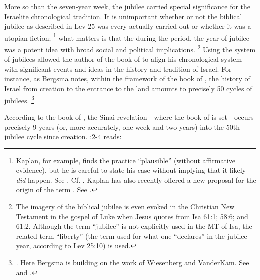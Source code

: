 More so than the seven-year week, the jubilee carried special significance for the Israelite chronological tradition. It is unimportant whether or not the biblical jubilee as described in Lev 25 was every actually carried out or whether it was a utopian fiction;%
    \footnote{Kaplan, for example, finds the practice ``plausible'' (without affirmative evidence), but he is careful to state his case without implying that it likely \emph{did} happen. See \cite{kaplan_cbq2019}. Cf. \cite[119]{wellhausen1957}. Kaplan has also recently offered a new proposal for the origin of the term . See \cite{kaplan_biblica2018}.}
what matters is that the during the \secondtemple period, the year of jubilee was a potent idea with broad social and political implications.%
    \footnote{The imagery of the biblical jubilee is even evoked in the Christian New Testament in the gospel of Luke when Jesus quotes from Isa 61:1; 58:6; and 61:2. Although the term  ``jubilee'' is not explicitly used in the MT of Isa, the related term  ``liberty'' (the term used for what one ``declares'' in the jubilee year, according to Lev 25:10) is used.}
Using the system of jubilees allowed the author of the book of \jub to align his chronological system with significant events and ideas in the history and tradition of Israel. For instance, as Bergsma notes, within the framework of the book of \jub, the history of Israel from creation to the entrance to the land amounts to precisely 50 cycles of jubilees.%
    \footnote{\Cite[234--235]{bergsma2007}. Here Bergsma is building on the work of Wiesenberg and VanderKam. See
        \cite[4]{wiesenberg_rev-qumran1961} and 
        \cite[522]{vanderkam-b_vanderkam2000}.}

According to the book of \jub, the Sinai revelation---where the book of \jub is set---occurs precisely 9 years (or, more accurately, one week and two years) into the 50th jubilee cycle since creation. :2-4 reads:



